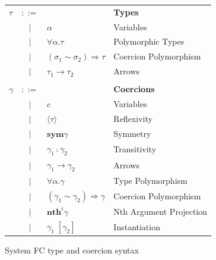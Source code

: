 \documentclass{sig-alternate}
\begin{document}
\begin{figure}[h!]
\begin{tabular}{lcll}
$\tau$ & $::=$ & & \textbf{Types} \\
       & $|$   & $\alpha$ & {\small Variables} \\
       & $|$   & $\forall \alpha.\tau$ & {\small Polymorphic Types} \\
       & $|$   & $(\sigma_1 \sim \sigma_2) \Rightarrow \tau$ & {\small Coercion Polymorphism} \\
       & $|$   & $\tau_1 \rightarrow \tau_2$ & {\small Arrows} \\
&&\; \hspace{.75in} \;& \\
$\gamma$ & $::=$ & & \textbf{Coercions} \\
         & $|$   & $c$ & {\small Variables} \\
         & $|$   & $\langle\tau\rangle$ & {\small Reflexivity} \\
         & $|$   & $\textbf{sym}\gamma$ & {\small Symmetry} \\
         & $|$   & $\gamma_1 \fcmp\gamma_2$ & {\small Transitivity} \\
         & $|$   & $\gamma_1 \rightarrow\gamma_2$ & {\small Arrows} \\
         & $|$   & $\forall \alpha.\gamma$ & {\small Type Polymorphism} \\
         & $|$   & $(\gamma_1\sim\gamma_2)\Rightarrow\gamma$ & {\small Coercion Polymorphism} \\
         & $|$   & $\textbf{nth}^i\gamma$ & {\small Nth Argument Projection} \\
         & $|$   & $\gamma_1\; [\gamma_2]$ & {\small Instantiation} \\
\end{tabular}
\caption{System FC type and coercion syntax}
\label{fig:type-syntax}
\end{figure}
\end{document}
